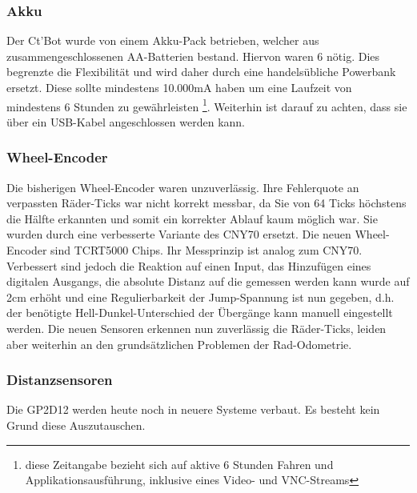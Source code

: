 \documentclass[twoside,12pt,a4paper]{report}
\begin{document}
	\subsubsection{Akku}
	Der Ct'Bot wurde von einem Akku-Pack betrieben, welcher aus zusammengeschlossenen AA-Batterien bestand. Hiervon waren 6 nötig. Dies begrenzte die Flexibilität und wird daher durch eine handelsübliche Powerbank ersetzt. Diese sollte mindestens 10.000mA haben um eine Laufzeit von mindestens 6 Stunden zu gewährleisten \footnote{diese Zeitangabe bezieht sich auf aktive 6 Stunden Fahren und Applikationsausführung, inklusive eines Video- und VNC-Streams}. Weiterhin ist darauf zu achten, dass sie über ein USB-Kabel angeschlossen werden kann. 
	
	\subsubsection{Wheel-Encoder}
	Die bisherigen Wheel-Encoder waren unzuverlässig. Ihre Fehlerquote an verpassten Räder-Ticks war nicht korrekt messbar, da Sie von 64 Ticks höchstens die Hälfte erkannten und somit ein korrekter Ablauf kaum möglich war. Sie wurden durch eine verbesserte Variante des CNY70 ersetzt. Die neuen Wheel-Encoder sind TCRT5000 Chips. Ihr Messprinzip ist analog zum CNY70. Verbessert sind jedoch die Reaktion auf einen Input, das Hinzufügen eines digitalen Ausgangs, die absolute Distanz auf die gemessen werden kann wurde auf 2cm erhöht und eine Regulierbarkeit der Jump-Spannung ist nun gegeben, d.h. der benötigte Hell-Dunkel-Unterschied der Übergänge kann manuell eingestellt werden. Die neuen Sensoren erkennen nun zuverlässig die Räder-Ticks, leiden aber weiterhin an den grundsätzlichen Problemen der Rad-Odometrie. 
	
	\subsubsection{Distanzsensoren}
	Die GP2D12 werden heute noch in neuere Systeme verbaut. Es besteht kein Grund diese Auszutauschen. \\
	
\end{document}
